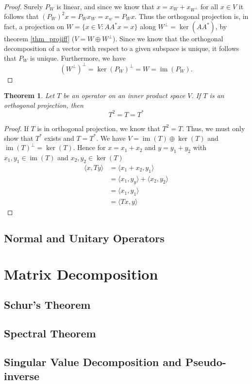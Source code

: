 \documentclass[oneside, 12pt]{book}
\DeclareMathOperator{\im}{im}
\newtheorem{thm}{Theorem}[section]
\theoremstyle{definition}
\begin{document}
\begin{proof}
  Surely $P_{W}$ is linear, and since we know that $x=x_{W}+x_{W^{\perp}}$ for all $x \in V$ it follows that $(P_{W})^{2}x=P_{W}x_{W}=x_{w}=P_{W}x$. Thus the orthogonal projection is, in fact, a projection on $W=\{x \in V: AA^{*}x=x \}$ along $W^{\perp}=\ker(AA^{*})$, by theorem \ref{thm_projiff} ($V=W \oplus W^{\perp}$). Since we know that the orthogonal decomposition of a vector with respect to a given subspace is unique, it follows that $P_{W}$ is unique.
  Furthermore, we have \[(W^{\perp})^{\perp}=\ker(P_{W})^{\perp}=W=\im(P_{W}).\]
\end{proof}
\begin{thm}
  \label{thm_orthprojsubsp}
Let $T$ be an operator on an inner product space $V$. If $T$ is an orthogonal projection, then \[T^{2}=T=T^{*}\]
\end{thm}
\begin{proof}
  If $T$ is in orthogonal projection, we know that $T^{2}=T$. Thus, we must only show that $T^{*}$ exists and $T=T^{*}.$ We have $V= \im(T) \oplus \ker(T)$ and $\im(T)^{\perp}=\ker(T).$ Hence for $x=x_{1}+x_{2}$ and $y=y_{1}+y_{2}$ with $x_{1},y_{1} \in \im(T)$ and $x_{2},y_{2} \in \ker(T)$
  \begin{align}
    \langle x , Ty \rangle &= \langle x_{1}+x_{2}, y_{1} \rangle \\
               &=\langle x_{1}, y_{y} \rangle + \langle x_{2}, y_{2} \rangle \\
               &=\langle x_{1}, y_{1} \rangle \\
               &= \langle Tx, y \rangle
  \end{align}
\end{proof}
\section{Normal and Unitary Operators}
\chapter{Matrix Decomposition}
\section{Schur's Theorem}
\section{Spectral Theorem}
\section{Singular Value Decomposition and Pseudo-inverse}
\end{document}
